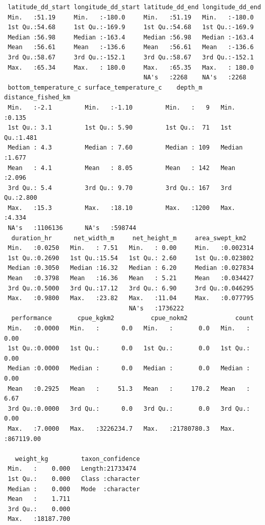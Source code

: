 \documentclass[
  letterpaper,
  oneside,
  open=any]{scrbook}
\begin{document}
\begin{verbatim}
 latitude_dd_start longitude_dd_start latitude_dd_end longitude_dd_end
 Min.   :51.19     Min.   :-180.0     Min.   :51.19   Min.   :-180.0  
 1st Qu.:54.68     1st Qu.:-169.9     1st Qu.:54.68   1st Qu.:-169.9  
 Median :56.98     Median :-163.4     Median :56.98   Median :-163.4  
 Mean   :56.61     Mean   :-136.6     Mean   :56.61   Mean   :-136.6  
 3rd Qu.:58.67     3rd Qu.:-152.1     3rd Qu.:58.67   3rd Qu.:-152.1  
 Max.   :65.34     Max.   : 180.0     Max.   :65.35   Max.   : 180.0  
                                      NA's   :2268    NA's   :2268    
 bottom_temperature_c surface_temperature_c    depth_m     distance_fished_km
 Min.   :-2.1         Min.   :-1.10         Min.   :   9   Min.   :0.135     
 1st Qu.: 3.1         1st Qu.: 5.90         1st Qu.:  71   1st Qu.:1.481     
 Median : 4.3         Median : 7.60         Median : 109   Median :1.677     
 Mean   : 4.1         Mean   : 8.05         Mean   : 142   Mean   :2.096     
 3rd Qu.: 5.4         3rd Qu.: 9.70         3rd Qu.: 167   3rd Qu.:2.800     
 Max.   :15.3         Max.   :18.10         Max.   :1200   Max.   :4.334     
 NA's   :1106136      NA's   :598744                                         
  duration_hr      net_width_m     net_height_m     area_swept_km2    
 Min.   :0.0250   Min.   : 7.51   Min.   : 0.00     Min.   :0.002314  
 1st Qu.:0.2690   1st Qu.:15.54   1st Qu.: 2.60     1st Qu.:0.023802  
 Median :0.3050   Median :16.32   Median : 6.20     Median :0.027834  
 Mean   :0.3798   Mean   :16.36   Mean   : 5.21     Mean   :0.034427  
 3rd Qu.:0.5000   3rd Qu.:17.12   3rd Qu.: 6.90     3rd Qu.:0.046295  
 Max.   :0.9800   Max.   :23.82   Max.   :11.04     Max.   :0.077795  
                                  NA's   :1736222                     
  performance       cpue_kgkm2          cpue_nokm2             count          
 Min.   :0.0000   Min.   :      0.0   Min.   :       0.0   Min.   :     0.00  
 1st Qu.:0.0000   1st Qu.:      0.0   1st Qu.:       0.0   1st Qu.:     0.00  
 Median :0.0000   Median :      0.0   Median :       0.0   Median :     0.00  
 Mean   :0.2925   Mean   :     51.3   Mean   :     170.2   Mean   :     6.67  
 3rd Qu.:0.0000   3rd Qu.:      0.0   3rd Qu.:       0.0   3rd Qu.:     0.00  
 Max.   :7.0000   Max.   :3226234.7   Max.   :21780780.3   Max.   :867119.00  
                                                                              
   weight_kg         taxon_confidence  
 Min.   :    0.000   Length:21733474   
 1st Qu.:    0.000   Class :character  
 Median :    0.000   Mode  :character  
 Mean   :    1.711                     
 3rd Qu.:    0.000                     
 Max.   :18187.700                     
                                       
\end{verbatim}
\end{document}
